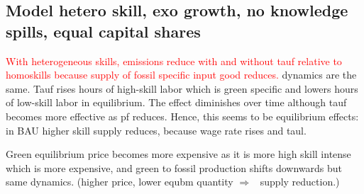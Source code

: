\documentclass[12pt]{article}
\newcommand{\ar}{$\Rightarrow$ \ }
\newcommand{\tr}[1]{\textcolor{red}{#1}}
\begin{document}
\clearpage
\newpage 

\subsection{Model hetero skill, exo growth, no knowledge spills, equal capital shares}
\tr{With heterogeneous skills, emissions reduce with and without tauf relative to homoskills because supply of fossil specific input good reduces.} dynamics are the same. Tauf rises hours of high-skill labor which is green specific and lowers hours of low-skill labor in equilibrium. The effect diminishes over time although tauf becomes more effective as pf reduces. Hence, this seems to be equilibrium effects: in BAU higher skill supply reduces, because wage rate rises and taul. 

Green equilibrium price becomes more expensive as it is more high skill intense which is more expensive, and green to fossil production shifts downwards but same dynamics. (higher price, lower equbm quantity \ar supply reduction.)
\end{document}

